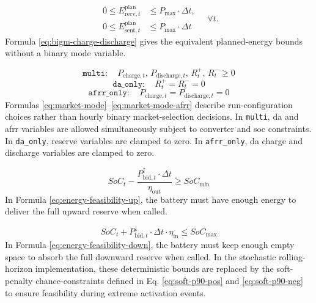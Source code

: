 \begin{equation}\label{eq:bigm-charge-discharge}
    \begin{aligned}
        0 \leq E_{\text{recv}, t}^{\text{plan}} & \leq P_{\text{max}} \cdot \Delta t, \\
        0 \leq E_{\text{sent}, t}^{\text{plan}} & \leq P_{\text{max}} \cdot \Delta t
    \end{aligned}
    \quad \forall t.
\end{equation}
Formula \ref{eq:bigm-charge-discharge} gives the equivalent planned-energy bounds without a binary mode variable.

\begin{equation}\label{eq:market-mode}
    \texttt{multi}: \quad
    P_{\text{charge},t},\,P_{\text{discharge},t},\,R_t^{+},\,R_t^{-} \ge 0
\end{equation}
\begin{equation}\label{eq:market-mode-energy}
    \texttt{da\_only}: \quad
    R_t^{+}=R_t^{-}=0
\end{equation}
\begin{equation}\label{eq:market-mode-afrr}
    \texttt{afrr\_only}: \quad
    P_{\text{charge},t}=P_{\text{discharge},t}=0
\end{equation}
Formulas \ref{eq:market-mode}--\ref{eq:market-mode-afrr} describe run-configuration choices rather than hourly binary market-selection decisions. In \texttt{multi}, \gls{da} and \gls{afrr} variables are allowed simultaneously subject to converter and \gls{soc} constraints. In \texttt{da\_only}, reserve variables are clamped to zero. In \texttt{afrr\_only}, \gls{da} charge and discharge variables are clamped to zero.

\begin{equation}\label{eq:energy-feasibility-up}
    SoC_{t} - \frac{P_{\text{bid}, t}^{\uparrow} \cdot \Delta t}{\eta_{\text{out}}} \geq SoC_{\min}
\end{equation}
In Formula \ref{eq:energy-feasibility-up}, the battery must have enough energy to deliver the full upward reserve when called.

\begin{equation}\label{eq:energy-feasibility-down}
    SoC_{t} + P_{\text{bid}, t}^{\downarrow} \cdot \Delta t \cdot \eta_{\text{in}} \leq SoC_{\max}
\end{equation}
In Formula \ref{eq:energy-feasibility-down}, the battery must keep enough empty space to absorb the full downward reserve when called.
In the stochastic rolling-horizon implementation, these deterministic bounds are replaced by the soft-penalty chance-constraints defined in Eq. \ref{eq:soft-p90-pos} and \ref{eq:soft-p90-neg} to ensure feasibility during extreme activation events.

